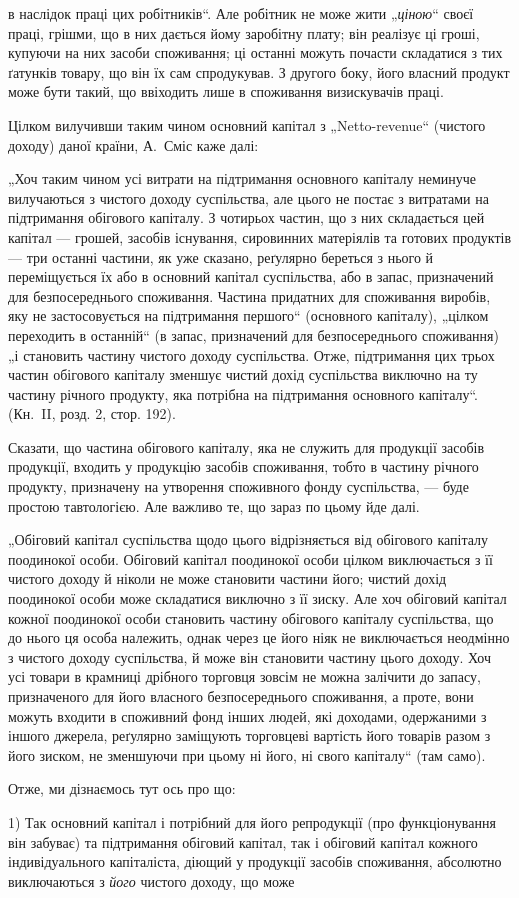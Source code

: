\parcont{}  %
в наслідок праці цих робітників“. Але робітник не може жити „\emph{ціною}“
своєї праці, грішми, що в них дається йому заробітну плату; він реалізує
ці гроші, купуючи на них засоби споживання; ці останні можуть
почасти складатися з тих ґатунків товару, що він їх сам спродукував.
З другого боку, його власний продукт може бути такий, що ввіходить
лише в споживання визискувачів праці.

Цілком вилучивши таким чином основний капітал з „Netto-revenue“
(чистого доходу) даної країни, А.~Сміс каже далі:

„Хоч таким чином усі витрати на підтримання основного капіталу
неминуче вилучаються з чистого доходу суспільства, але цього не постає
з витратами на підтримання обігового капіталу. З чотирьох частин, що
з них складається цей капітал — грошей, засобів існування, сировинних
матеріялів та готових продуктів — три останні частини, як уже сказано,
реґулярно береться з нього й переміщується їх або в основний капітал
суспільства, або в запас, призначений для безпосереднього споживання.
Частина придатних для споживання виробів, яку не застосовується на
підтримання першого“ (основного капіталу), „цілком переходить в останній“
(в запас, призначений для безпосереднього споживання) „і становить
частину чистого доходу суспільства. Отже, підтримання цих трьох
частин обігового капіталу зменшує чистий дохід суспільства виключно
на ту частину річного продукту, яка потрібна на підтримання основного
капіталу“. (Кн.~II, розд. 2, стор. 192).

Сказати, що частина обігового капіталу, яка не служить для продукції
засобів продукції, входить у продукцію засобів споживання, тобто в частину
річного продукту, призначену на утворення споживного фонду
суспільства, — буде простою тавтологією. Але важливо те, що зараз по
цьому йде далі.

„Обіговий капітал суспільства щодо цього відрізняється від обігового
капіталу поодинокої особи. Обіговий капітал поодинокої особи цілком
виключається з її чистого доходу й ніколи не може становити частини
його; чистий дохід поодинокої особи може складатися виключно з її
зиску. Але хоч обіговий капітал кожної поодинокої особи становить
частину обігового капіталу суспільства, що до нього ця особа належить,
однак через це його ніяк не виключається неодмінно з чистого доходу
суспільства, й може він становити частину цього доходу. Хоч усі товари
в крамниці дрібного торговця зовсім не можна залічити до запасу, призначеного
для його власного безпосереднього споживання, а проте, вони
можуть входити в споживний фонд інших людей, які доходами, одержаними
з іншого джерела, реґулярно заміщують торговцеві вартість його
товарів разом з його зиском, не зменшуючи при цьому ні його, ні свого
капіталу“ (там само).

Отже, ми дізнаємось тут ось про що:

1) Так основний капітал і потрібний для його репродукції (про функціонування
він забуває) та підтримання обіговий капітал, так і обіговий
капітал кожного індивідуального капіталіста, діющий у продукції засобів
споживання, абсолютно виключаються з \emph{його} чистого доходу, що може
\parbreak{}  %

